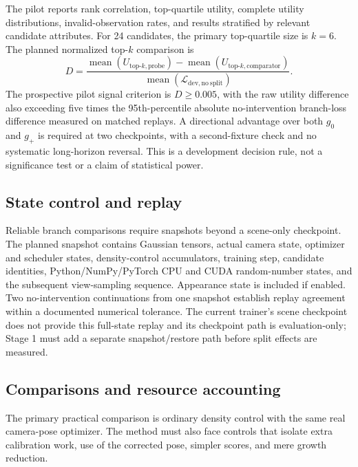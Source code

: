 \documentclass[10pt]{article}
\begin{document}
The pilot reports rank correlation, top-quartile utility, complete utility
distributions, invalid-observation rates, and results stratified by relevant
candidate attributes. For 24 candidates, the primary top-quartile size is
\(k=6\). The planned normalized top-\(k\) comparison is
\[
D =
\frac{
  \operatorname{mean}(U_{\mathrm{top}\text{-}k,\mathrm{probe}})
  -\operatorname{mean}(U_{\mathrm{top}\text{-}k,\mathrm{comparator}})
}{
  \operatorname{mean}(\mathcal{L}_{\mathrm{dev,no\ split}})
}.
\]
The prospective pilot signal criterion is \(D\geq0.005\), with the raw
utility difference also exceeding five times the 95th-percentile absolute
no-intervention branch-loss difference measured on matched replays. A
directional advantage over both \(g_0\) and \(g_+\) is required at two
checkpoints, with a second-fixture check and no systematic long-horizon
reversal. This is a development decision rule, not a significance test or a
claim of statistical power.

\subsection{State control and replay}

Reliable branch comparisons require snapshots beyond a scene-only checkpoint.
The planned snapshot contains Gaussian tensors, actual camera state, optimizer
and scheduler states, density-control accumulators, training step, candidate
identities, Python/NumPy/PyTorch CPU and CUDA random-number states, and the
subsequent view-sampling sequence. Appearance state is included if enabled.
Two no-intervention continuations from one snapshot establish replay
agreement within a documented numerical tolerance. The current trainer's
scene checkpoint does not provide this full-state replay and its checkpoint
path is evaluation-only; Stage 1 must add a separate snapshot/restore path
before split effects are measured.

\subsection{Comparisons and resource accounting}

The primary practical comparison is ordinary density control with the same
real camera-pose optimizer. The method must also face controls that isolate
extra calibration work, use of the corrected pose, simpler scores, and mere
growth reduction.
\end{document}
